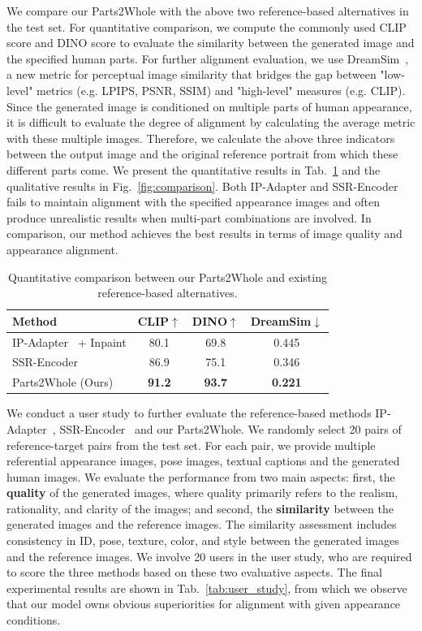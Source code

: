 We compare our Parts2Whole with the above two reference-based alternatives in the test set. For quantitative comparison, we compute the commonly used CLIP score and DINO score to evaluate the similarity between the generated image and the specified human parts. For further alignment evaluation, we use DreamSim~\cite{fu2023dreamsim}, a new metric for perceptual image similarity that bridges the gap between "low-level" metrics (e.g. LPIPS, PSNR, SSIM) and "high-level" measures (e.g. CLIP). Since the generated image is conditioned on multiple parts of human appearance, it is difficult to evaluate the degree of alignment by calculating the average metric with these multiple images. Therefore, we calculate the above three indicators between the output image and the original reference portrait from which these different parts come. We present the quantitative results in Tab.~\ref{tab:quan_comp} and the qualitative results in Fig.~\ref{fig:comparison}. Both IP-Adapter and SSR-Encoder fails to maintain alignment with the specified appearance images and often produce unrealistic results when multi-part combinations are involved. In comparison, our method achieves the best results in terms of image quality and appearance alignment.

\begin{table}\small
  \centering
  \caption{Quantitative comparison between our Parts2Whole and existing reference-based alternatives.}
  \begin{tabular}{@{}lccc@{}}
    \toprule
    Method & CLIP$\uparrow$ & DINO$\uparrow$ & DreamSim\cite{fu2023dreamsim}$\downarrow$ \\
    \midrule
    IP-Adapter~\cite{ye2023ipadapter} + Inpaint & 80.1 & 69.8 & 0.445   \\
    SSR-Encoder~\cite{zhang2024ssrencoder} & 86.9 & 75.1 & 0.346 \\
   Parts2Whole (Ours) & \textbf{91.2} & \textbf{93.7} & \textbf{0.221}  \\
    \bottomrule
  \end{tabular}
  \label{tab:quan_comp}
\end{table}

We conduct a user study to further evaluate the reference-based methods IP-Adapter~\cite{ye2023ipadapter}, SSR-Encoder~\cite{zhang2024ssrencoder} and our Parts2Whole. We randomly select 20 pairs of reference-target pairs from the test set. For each pair, we provide multiple referential appearance images, pose images, textual captions and the generated human images. We evaluate the performance from two main aspects: first, the \textbf{quality} of the generated images, where quality primarily refers to the realism, rationality, and clarity of the images; and second, the \textbf{similarity} between the generated images and the reference images. The similarity assessment includes consistency in ID, pose, texture, color, and style between the generated images and the reference images. We involve 20 users in the user study, who are required to score the three methods based on these two evaluative aspects. The final experimental results are shown in Tab.~\ref{tab:user_study}, from which we observe that our model owns obvious superiorities for alignment with given appearance conditions.

